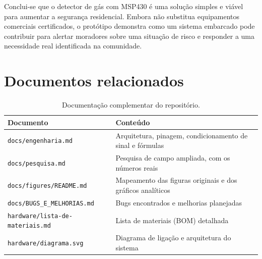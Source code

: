 \documentclass[11pt,a4paper]{article}
\numberwithin{equation}{section}
\begin{document}
Conclui-se que o detector de gás com MSP430 é uma solução simples e viável para aumentar a segurança
residencial. Embora não substitua equipamentos comerciais certificados, o protótipo demonstra como um
sistema embarcado pode contribuir para alertar moradores sobre uma situação de risco e responder a uma
necessidade real identificada na comunidade.

\section*{Documentos relacionados}

\begin{table}[htbp]
  \centering
  \small
  \begin{tabular}{@{}p{5.6cm}p{8.4cm}@{}}
    \toprule
    \textbf{Documento} & \textbf{Conteúdo} \\
    \midrule
    \texttt{docs/engenharia.md} & Arquitetura, pinagem, condicionamento de sinal e fórmulas \\
    \addlinespace
    \texttt{docs/pesquisa.md} & Pesquisa de campo ampliada, com os números reais \\
    \addlinespace
    \texttt{docs/figures/README.md} & Mapeamento das figuras originais e dos gráficos analíticos \\
    \addlinespace
    \texttt{docs/BUGS\_E\_MELHORIAS.md} & Bugs encontrados e melhorias planejadas \\
    \addlinespace
    \texttt{hardware/lista-de-materiais.md} & Lista de materiais (BOM) detalhada \\
    \addlinespace
    \texttt{hardware/diagrama.svg} & Diagrama de ligação e arquitetura do sistema \\
    \bottomrule
  \end{tabular}
  \caption*{Documentação complementar do repositório.}
\end{table}
\end{document}

